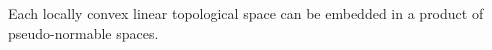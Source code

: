Each locally convex linear topological space can be embedded in a product of pseudo-normable spaces.

